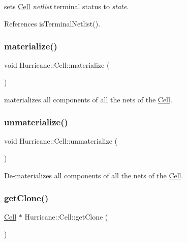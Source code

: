 sets \mbox{\hyperlink{classHurricane_1_1Cell}{Cell}} {\itshape netlist} terminal status to {\itshape state}. 

References is\+Terminal\+Netlist().

\mbox{\label{classHurricane_1_1Cell_affefc597317063857f4904d4b16d5d4f}} 
\subsubsection{\texorpdfstring{materialize()}{materialize()}}
{\footnotesize\ttfamily void Hurricane\+::\+Cell\+::materialize (\begin{DoxyParamCaption}{ }\end{DoxyParamCaption})}

materializes all components of all the nets of the \mbox{\hyperlink{classHurricane_1_1Cell}{Cell}}. \mbox{\label{classHurricane_1_1Cell_a40c9ba4e3fc76b0c4bc58af8dcaddf53}} 
\subsubsection{\texorpdfstring{unmaterialize()}{unmaterialize()}}
{\footnotesize\ttfamily void Hurricane\+::\+Cell\+::unmaterialize (\begin{DoxyParamCaption}{ }\end{DoxyParamCaption})}

De-\/materializes all components of all the nets of the \mbox{\hyperlink{classHurricane_1_1Cell}{Cell}}. \mbox{\label{classHurricane_1_1Cell_a092f53c7f517ecc70d9ba375296c5d5b}} 
\subsubsection{\texorpdfstring{get\+Clone()}{getClone()}}
{\footnotesize\ttfamily \mbox{\hyperlink{classHurricane_1_1Cell}{Cell}} $\ast$ Hurricane\+::\+Cell\+::get\+Clone (\begin{DoxyParamCaption}{ }\end{DoxyParamCaption})}

